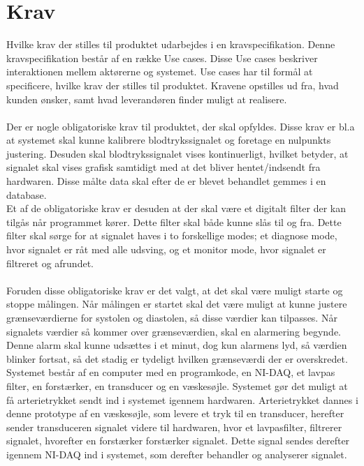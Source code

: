 \chapter{Krav}
Hvilke krav der stilles til produktet udarbejdes i en kravspecifikation. Denne kravspecifikation består af en række Use cases. Disse Use cases beskriver interaktionen mellem aktørerne og systemet. Use cases har til formål at specificere, hvilke krav der stilles til produktet. Kravene opstilles ud fra, hvad kunden ønsker, samt hvad leverandøren finder muligt at realisere. \\ \\
Der er nogle obligatoriske krav til produktet, der skal opfyldes. Disse krav er bl.a at systemet skal kunne kalibrere blodtrykssignalet og foretage en nulpunkts justering. Desuden skal blodtrykssignalet vises kontinuerligt, hvilket betyder, at signalet skal vises grafisk samtidigt med at det bliver hentet/indsendt fra hardwaren. Disse målte data skal efter de er blevet behandlet gemmes i en database.\\
Et af de obligatoriske krav er desuden at der skal være et digitalt filter der kan tilgås når programmet kører. Dette filter skal både kunne slås til og fra. Dette filter skal sørge for at signalet haves i to forskellige modes; et diagnose mode, hvor signalet er råt med alle udsving, og et monitor mode, hvor signalet er filtreret og afrundet.\\\\
Foruden disse obligatoriske krav er det valgt, at det skal være muligt starte og stoppe målingen. Når målingen er startet skal det være muligt at kunne justere grænseværdierne for systolen og diastolen, så disse værdier kan tilpasses. Når signalets værdier så kommer over grænseværdien, skal en alarmering begynde. Denne alarm skal kunne udsættes i et minut, dog kun alarmens lyd, så værdien blinker fortsat, så det stadig er tydeligt hvilken grænseværdi der er overskredet.\\
Systemet består af en computer med en programkode, en NI-DAQ, et lavpas filter, en forstærker, en transducer og en væskesøjle.
Systemet gør det muligt at få arterietrykket sendt ind i systemet igennem hardwaren. Arterietrykket dannes i denne prototype af en væskesøjle, som levere et tryk til en transducer, herefter sender transduceren signalet videre til hardwaren, hvor et lavpasfilter, filtrerer signalet, hvorefter en forstærker forstærker signalet. Dette signal sendes derefter igennem NI-DAQ ind i systemet, som derefter behandler og analyserer signalet.\\
